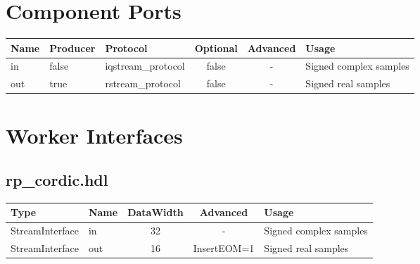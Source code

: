 \documentclass{article}
\def\comp{rp\_cordic}
\begin{document}
\begin{landscape}
\begin{scriptsize}
\begin{longtable}
		\end{longtable}
	\end{scriptsize}

	\section*{Component Ports}
	\begin{scriptsize}
		\begin{tabular}{|M{2cm}|M{1.5cm}|M{4cm}|c|c|M{9cm}|}
			\hline
			Name & Producer & Protocol           & Optional & Advanced & Usage                  \\
			\hline
			in   & false    & iqstream\_protocol & false    & -        & Signed complex samples \\
			\hline
			out  & true     & rstream\_protocol  & false    & -        & Signed real samples    \\
			\hline
		\end{tabular}
	\end{scriptsize}

	\section*{Worker Interfaces}
	\subsection*{\comp.hdl}
	\begin{scriptsize}
		\begin{tabular}{|M{2cm}|M{1.5cm}|c|c|M{12cm}|}
			\hline
			\rowcolor{blue}
			Type            & Name & DataWidth & Advanced                & Usage                  \\
			\hline
			StreamInterface & in   & 32        & - & Signed complex samples \\
			\hline
			StreamInterface & out  & 16        & InsertEOM=1 & Signed real samples    \\
			\hline
		\end{tabular}
	\end{scriptsize}
\end{landscape}
\end{document}
